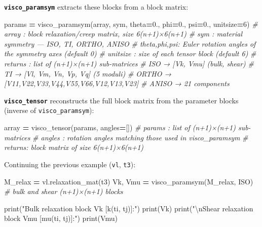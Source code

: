 \documentclass[
  a4paper,
  numbers=noendperiod,
  DIV=12]{scrreprt}
\newenvironment{Shaded}{\begin{snugshade}}{\end{snugshade}}
\newcommand{\BuiltInTok}[1]{#1}
\newcommand{\CharTok}[1]{\textcolor[rgb]{0.31,0.60,0.02}{#1}}
\newcommand{\CommentTok}[1]{\textcolor[rgb]{0.56,0.35,0.01}{\textit{#1}}}
\newcommand{\DecValTok}[1]{\textcolor[rgb]{0.00,0.00,0.81}{#1}}
\newcommand{\FloatTok}[1]{\textcolor[rgb]{0.00,0.00,0.81}{#1}}
\newcommand{\NormalTok}[1]{#1}
\newcommand{\OperatorTok}[1]{\textcolor[rgb]{0.81,0.36,0.00}{\textbf{#1}}}
\newcommand{\StringTok}[1]{\textcolor[rgb]{0.31,0.60,0.02}{#1}}
\begin{document}
\textbf{\texttt{visco\_paramsym}} extracts these blocks from a block
matrix:

\begin{Shaded}
\begin{Highlighting}[]
\NormalTok{params }\OperatorTok{=}\NormalTok{ visco\_paramsym(array, sym, theta}\OperatorTok{=}\FloatTok{0.}\NormalTok{, phi}\OperatorTok{=}\FloatTok{0.}\NormalTok{, psi}\OperatorTok{=}\FloatTok{0.}\NormalTok{, unitsize}\OperatorTok{=}\DecValTok{6}\NormalTok{)}
\CommentTok{\# array        : block relaxation/creep matrix, size 6(n+1)×6(n+1)}
\CommentTok{\# sym          : material symmetry — ISO, TI, ORTHO, ANISO}
\CommentTok{\# theta,phi,psi: Euler rotation angles of the symmetry axes (default 0)}
\CommentTok{\# unitsize     : size of each tensor block (default 6)}
\CommentTok{\# returns      : list of (n+1)×(n+1) sub{-}matrices}
\CommentTok{\#                ISO   → [Vk, Vmu]                   (bulk, shear)}
\CommentTok{\#                TI    → [Vl, Vm, Vn, Vp, Vq]        (5 moduli)}
\CommentTok{\#                ORTHO → [V11,V22,V33,V44,V55,V66,V12,V13,V23]}
\CommentTok{\#                ANISO → 21 components}
\end{Highlighting}
\end{Shaded}

\textbf{\texttt{visco\_tensor}} reconstructs the full block matrix from
the parameter blocks (inverse of \texttt{visco\_paramsym}):

\begin{Shaded}
\begin{Highlighting}[]
\NormalTok{array }\OperatorTok{=}\NormalTok{ visco\_tensor(params, angles}\OperatorTok{=}\NormalTok{[])}
\CommentTok{\# params : list of (n+1)×(n+1) sub{-}matrices}
\CommentTok{\# angles : rotation angles matching those used in visco\_paramsym}
\CommentTok{\# returns: block matrix of size 6(n+1)×6(n+1)}
\end{Highlighting}
\end{Shaded}

Continuing the previous example (\texttt{vl}, \texttt{t3}):

\begin{Shaded}
\begin{Highlighting}[]
\NormalTok{M\_relax }\OperatorTok{=}\NormalTok{ vl.relaxation\_mat(t3)}
\NormalTok{Vk, Vmu }\OperatorTok{=}\NormalTok{ visco\_paramsym(M\_relax, ISO)   }\CommentTok{\# bulk and shear (n+1)×(n+1) blocks}

\BuiltInTok{print}\NormalTok{(}\StringTok{"Bulk relaxation block Vk  [k(ti, tj)]:"}\NormalTok{)}
\BuiltInTok{print}\NormalTok{(Vk)}
\BuiltInTok{print}\NormalTok{(}\StringTok{"}\CharTok{\textbackslash{}n}\StringTok{Shear relaxation block Vmu  [mu(ti, tj)]:"}\NormalTok{)}
\BuiltInTok{print}\NormalTok{(Vmu)}
\end{Highlighting}
\end{Shaded}
\end{document}
